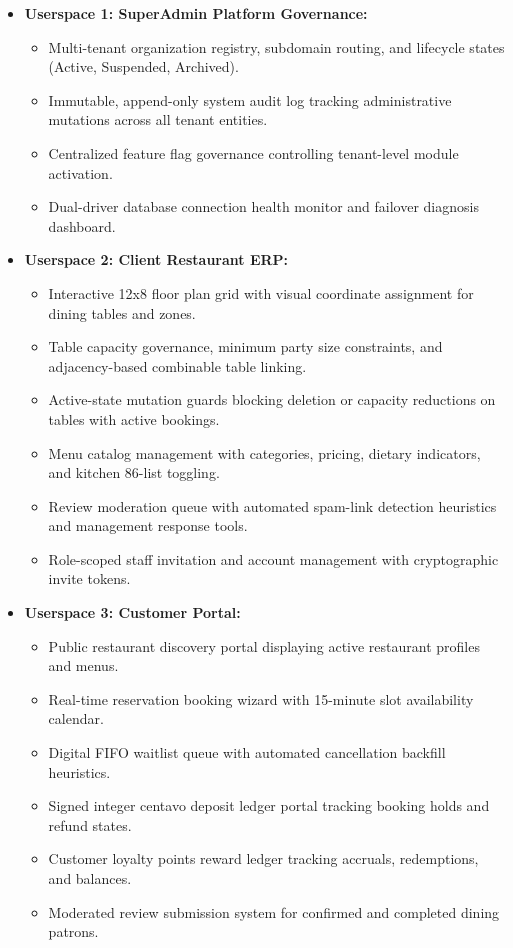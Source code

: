 \begin{itemize}
    \item \textbf{Userspace 1: SuperAdmin Platform Governance:}
    \begin{itemize}
        \item Multi-tenant organization registry, subdomain routing, and lifecycle states (Active, Suspended, Archived).
        \item Immutable, append-only system audit log tracking administrative mutations across all tenant entities.
        \item Centralized feature flag governance controlling tenant-level module activation.
        \item Dual-driver database connection health monitor and failover diagnosis dashboard.
    \end{itemize}
    \item \textbf{Userspace 2: Client Restaurant ERP:}
    \begin{itemize}
        \item Interactive 12x8 floor plan grid with visual coordinate assignment for dining tables and zones.
        \item Table capacity governance, minimum party size constraints, and adjacency-based combinable table linking.
        \item Active-state mutation guards blocking deletion or capacity reductions on tables with active bookings.
        \item Menu catalog management with categories, pricing, dietary indicators, and kitchen 86-list toggling.
        \item Review moderation queue with automated spam-link detection heuristics and management response tools.
        \item Role-scoped staff invitation and account management with cryptographic invite tokens.
    \end{itemize}
    \item \textbf{Userspace 3: Customer Portal:}
    \begin{itemize}
        \item Public restaurant discovery portal displaying active restaurant profiles and menus.
        \item Real-time reservation booking wizard with 15-minute slot availability calendar.
        \item Digital FIFO waitlist queue with automated cancellation backfill heuristics.
        \item Signed integer centavo deposit ledger portal tracking booking holds and refund states.
        \item Customer loyalty points reward ledger tracking accruals, redemptions, and balances.
        \item Moderated review submission system for confirmed and completed dining patrons.
    \end{itemize}
\end{itemize}

